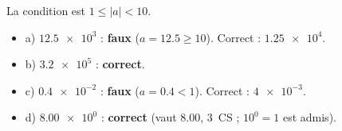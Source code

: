 \documentclass[11pt,a4paper]{article}
\begin{document}
\begin{cor}
La condition est $1\le|a|<10$.
\begin{itemize}[leftmargin=1.6em,itemsep=1pt]
  \item a) $\num{12,5e3}$ : \textbf{faux} ($a=\num{12,5}\ge10$). Correct : $\num{1,25e4}$.
  \item b) $\num{3,2e5}$ : \textbf{correct}.
  \item c) $\num{0,4e-2}$ : \textbf{faux} ($a=\num{0,4}<1$). Correct : $\num{4e-3}$.
  \item d) $\num{8,00e0}$ : \textbf{correct} (vaut $\num{8,00}$, $3$~CS ; $10^0=1$ est admis).
\end{itemize}
\end{cor}
\end{document}
